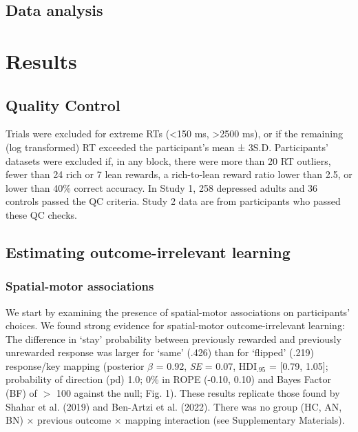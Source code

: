 \documentclass[
  man,floatsintext]{apa6}
\begin{document}
\hypertarget{data-analysis}{%
\subsection{Data analysis}\label{data-analysis}}

\hypertarget{results}{%
\section{Results}\label{results}}

\hypertarget{quality-control}{%
\subsection{Quality Control}\label{quality-control}}

Trials were excluded for extreme RTs (\textless150 ms, \textgreater2500 ms), or if
the remaining (log transformed) RT exceeded the participant's
mean ± 3S.D. Participants' datasets were excluded if, in any
block, there were more than 20 RT outliers, fewer than 24 rich
or 7 lean rewards, a rich-to-lean reward ratio lower than 2.5, or
lower than 40\% correct accuracy. In Study 1, 258 depressed adults
and 36 controls passed the QC criteria. Study 2 data are from participants who passed these QC checks.

\hypertarget{estimating-outcome-irrelevant-learning}{%
\subsection{Estimating outcome-irrelevant learning}\label{estimating-outcome-irrelevant-learning}}

\hypertarget{spatial-motor-associations}{%
\subsubsection{Spatial-motor associations}\label{spatial-motor-associations}}

We start by examining the presence of spatial-motor associations on participants' choices. We found strong evidence for spatial-motor outcome-irrelevant learning: The difference in `stay' probability between previously rewarded and previously unrewarded response was larger for `same' (.426) than for `flipped' (.219) response/key mapping (posterior \(\beta\) = 0.92, \emph{SE} = 0.07, \(\text{HDI}_{.95}\) = {[}0.79, 1.05{]}; probability of direction (pd) 1.0; 0\% in ROPE (-0.10, 0.10) and Bayes Factor (BF) of \(>\) 100 against the null; Fig. 1). These results replicate those found by Shahar et al. (2019) and Ben-Artzi et al. (2022). There was no group (HC, AN, BN) \(\times\) previous outcome \(\times\) mapping interaction (see Supplementary Materials).
\end{document}
